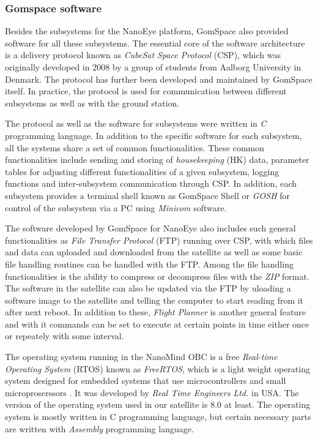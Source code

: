\documentclass[english,12pt,a4paper,pdftex,elec,utf8]{aaltothesis}
\begin{document}
\subsubsection{Gomspace software}
Besides the subsystems for the NanoEye platform, GomSpace also provided software for all these subsystems. The essential core of the software architecture is a delivery protocol known as \textit{CubeSat Space Protocol} (CSP), which was originally developed in 2008 by a group of students from Aalborg University in Denmark. The protocol has further been developed and maintained by GomSpace itself. In practice, the protocol is used for communication between different subsystems as well as with the ground station. \cite{gomspacesdk}\par 
The protocol as well as the software for subsystems were written in \textit{C} programming language. In addition to the specific software for each subsystem, all the systems share a set of common functionalities. These common functionalities include sending and storing of \textit{housekeeping} (HK) data, parameter tables for adjusting different functionalities of a given subsystem, logging functions and inter-subsystem communication through CSP. In addition, each subsystem provides a terminal shell known as GomSpace Shell or \textit{GOSH} for control of the subsystem via a PC using \textit{Minicom} software. \cite{gomspacesdk} \par 
The software developed by GomSpace for NanoEye also includes such general functionalities as \textit{File Transfer Protocol} (FTP) running over CSP, with which files and data can uploaded and downloaded from the satellite as well as some basic file handling routines can be handled with the FTP. Among the file handling functionalities is the ability to compress or decompress files with the \textit{ZIP} format. The software in the satellite can also be updated via the FTP by uloading a software image to the satellite and telling the computer to start reading from it after next reboot. In addition to these, \textit{Flight Planner} is another general feature and with it commands can be set to execute at certain points in time either once or repeately with some interval. \cite{gomspacesdk}\par
The operating system running in the NanoMind OBC is a free \textit{Real-time Operating System} (RTOS) known as \textit{FreeRTOS}, which is a light weight operating system designed for embedded systems that use microcontrollers and small microproserssors \cite{freertosref}. It was developed by \textit{Real Time Engineers Ltd.} in USA. The version of the operating system used in our satellite is 8.0 at least. The operating system is mostly written in C programming language, but certain necessary parts are written with \textit{Assembly} programming language.\par 
\end{document}
